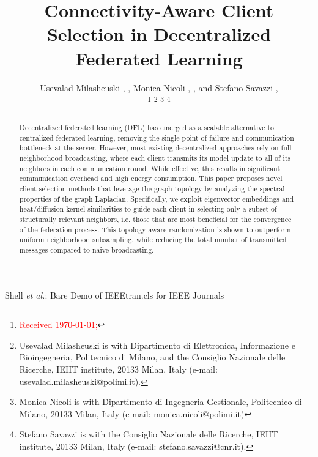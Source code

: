 \documentclass[journal]{IEEEtran}
\begin{document}
\title{Connectivity-Aware Client Selection in Decentralized Federated Learning}

\author{Usevalad Milasheuski , , Monica Nicoli , , and Stefano Savazzi , 

\thanks{\textcolor{red}{Received \today;}}
\thanks{Usevalad Milasheuski is with Dipartimento di Elettronica, Informazione e Bioingegneria, Politecnico di Milano, and the Consiglio Nazionale delle Ricerche, IEIIT institute, 20133 Milan, Italy (e-mail:
usevalad.milasheuski@polimi.it).}
\thanks{Monica Nicoli is with Dipartimento di Ingegneria Gestionale, Politecnico di Milano, 20133 Milan, Italy (e-mail: monica.nicoli@polimi.it)}
\thanks{Stefano Savazzi is with the Consiglio Nazionale delle Ricerche, IEIIT institute, 20133 Milan, Italy (e-mail: stefano.savazzi@cnr.it).}}


{Shell \MakeLowercase{\textit{et al.}}: Bare Demo of IEEEtran.cls for IEEE Journals}
\maketitle

\begin{abstract}
Decentralized federated learning (DFL) has emerged as a scalable alternative to centralized federated learning, removing the single point of failure and communication bottleneck at the server. However, most existing decentralized approaches rely on full-neighborhood broadcasting, where each client transmits its model update to all of its neighbors in each communication round. While effective, this results in significant communication overhead and high energy consumption. This paper proposes novel client selection methods that leverage the graph topology by analyzing the spectral properties of the graph Laplacian. Specifically, we exploit eigenvector embeddings and heat/diffusion kernel similarities to guide each client in selecting only a subset of structurally relevant neighbors, i.e. those that are most beneficial for the convergence of the federation process. This topology-aware randomization is shown to outperform uniform neighborhood subsampling, while reducing the total number of transmitted messages compared to naive broadcasting.
\end{abstract}
\end{document}
